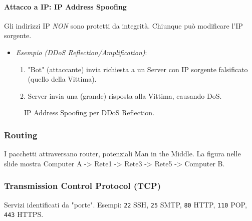 \paragraph{Attacco a IP: IP Address Spoofing}
Gli indirizzi IP \textit{NON} sono protetti da integrità. Chiunque può modificare l'IP sorgente.
\begin{itemize}
    \item \textit{Esempio (DDoS Reflection/Amplification)}:
    \begin{enumerate}
        \item "Bot" (attaccante) invia richiesta a un Server con IP sorgente falsificato (quello della Vittima).
        \item Server invia una (grande) risposta alla Vittima, causando DoS.
    \end{enumerate}
\end{itemize}
\begin{figure}[H]
    \centering
    \caption{IP Address Spoofing per DDoS Reflection.}
\end{figure}

\subsubsection{Routing}
I pacchetti attraversano router, potenziali Man in the Middle. La figura nelle slide mostra Computer A -> Rete1 -> Rete3 -> Rete5 -> Computer B.

\subsubsection{Transmission Control Protocol (TCP)}
Servizi identificati da "porte". Esempi:
\texttt{22} SSH, \texttt{25} SMTP, \texttt{80} HTTP, \texttt{110} POP, \texttt{443} HTTPS.


